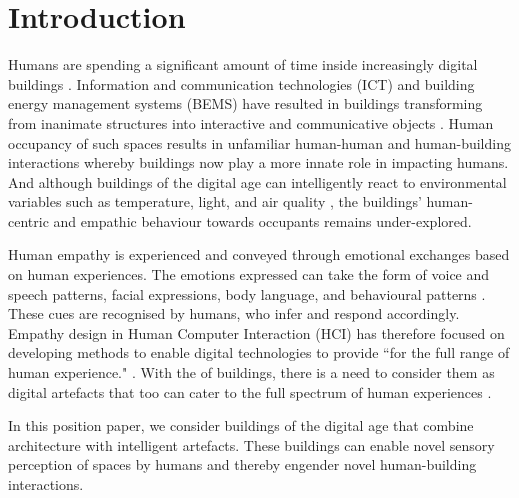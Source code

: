 \documentclass [sigconf, review, anonymous] {acmart}
\begin{document}
\section{Introduction}

Humans are spending a significant amount of time inside increasingly digital buildings \cite{alavi2016future}. Information and communication technologies (ICT) and building energy management systems (BEMS) have resulted in buildings transforming from inanimate structures into interactive and communicative objects \cite{nembrini2017human}. Human occupancy of such spaces results in unfamiliar human-human and human-building interactions whereby buildings now play a more innate role in impacting humans. And although buildings of the digital age can intelligently react to environmental variables such as temperature, light, and air quality \cite{bluyssen2009indoor, moreno2014user}, the buildings' human-centric and empathic behaviour towards occupants remains under-explored. 

Human empathy is experienced and conveyed through emotional exchanges based on human experiences. The emotions expressed can take the form of voice and speech patterns, facial expressions, body language, and behavioural patterns \cite{riess2017science}. These cues are recognised by humans, who infer and respond accordingly. Empathy design in Human Computer Interaction (HCI) has therefore focused on developing methods to enable digital technologies to provide ``for the full range of human experience." \cite{wright2008empathy}. With the  of buildings, there is a need to consider them as digital artefacts that too can cater to the full spectrum of human experiences \cite{derix2014empathic}. 

In this position paper, we consider buildings of the digital age that combine architecture with intelligent artefacts. These buildings can enable novel sensory perception of spaces by humans and thereby engender novel human-building interactions. 

\end{document}
